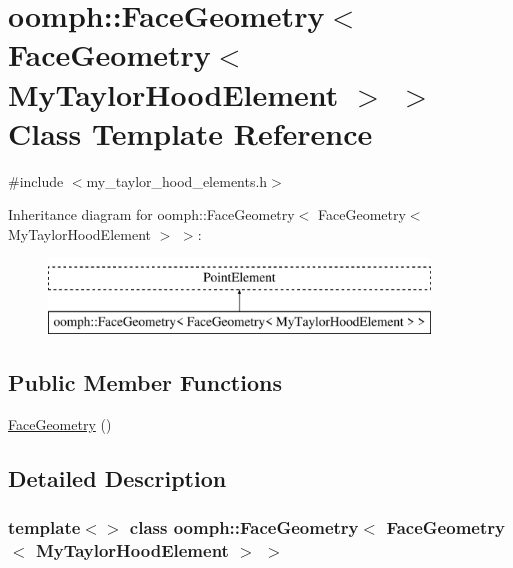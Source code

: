 \hypertarget{classoomph_1_1FaceGeometry_3_01FaceGeometry_3_01MyTaylorHoodElement_01_4_01_4}{}\section{oomph\+:\+:Face\+Geometry$<$ Face\+Geometry$<$ My\+Taylor\+Hood\+Element $>$ $>$ Class Template Reference}
\label{classoomph_1_1FaceGeometry_3_01FaceGeometry_3_01MyTaylorHoodElement_01_4_01_4}


{\ttfamily \#include $<$my\+\_\+taylor\+\_\+hood\+\_\+elements.\+h$>$}

Inheritance diagram for oomph\+:\+:Face\+Geometry$<$ Face\+Geometry$<$ My\+Taylor\+Hood\+Element $>$ $>$\+:\begin{figure}[H]
\begin{center}
\leavevmode
\includegraphics[height=2.000000cm]{classoomph_1_1FaceGeometry_3_01FaceGeometry_3_01MyTaylorHoodElement_01_4_01_4}
\end{center}
\end{figure}
\subsection*{Public Member Functions}
\begin{DoxyCompactItemize}
\item 
\hyperlink{classoomph_1_1FaceGeometry_3_01FaceGeometry_3_01MyTaylorHoodElement_01_4_01_4_a35f1bde1f3b3cc7c29d417cd75f0ef86}{Face\+Geometry} ()
\end{DoxyCompactItemize}


\subsection{Detailed Description}
\subsubsection*{template$<$$>$\newline
class oomph\+::\+Face\+Geometry$<$ Face\+Geometry$<$ My\+Taylor\+Hood\+Element $>$ $>$}

